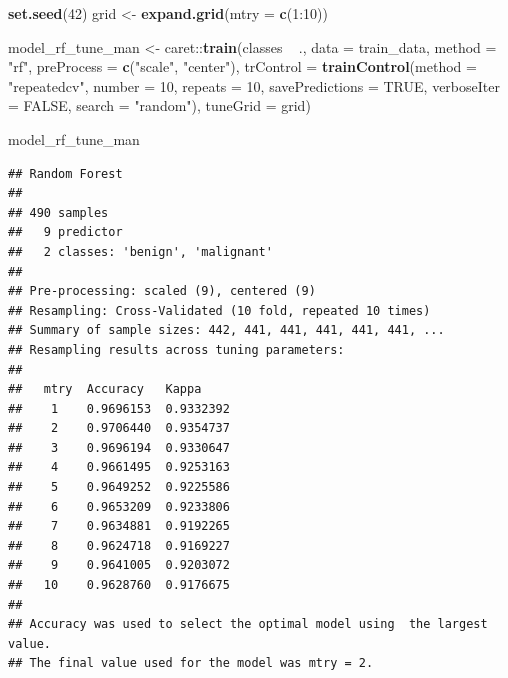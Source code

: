 \documentclass[]{article}
\newenvironment{Shaded}{\begin{snugshade}}{\end{snugshade}}
\newcommand{\KeywordTok}[1]{\textcolor[rgb]{0.13,0.29,0.53}{\textbf{{#1}}}}
\newcommand{\DataTypeTok}[1]{\textcolor[rgb]{0.13,0.29,0.53}{{#1}}}
\newcommand{\DecValTok}[1]{\textcolor[rgb]{0.00,0.00,0.81}{{#1}}}
\newcommand{\StringTok}[1]{\textcolor[rgb]{0.31,0.60,0.02}{{#1}}}
\newcommand{\OtherTok}[1]{\textcolor[rgb]{0.56,0.35,0.01}{{#1}}}
\newcommand{\NormalTok}[1]{{#1}}
\begin{document}
\begin{Shaded}
\begin{Highlighting}[]
\KeywordTok{set.seed}\NormalTok{(}\DecValTok{42}\NormalTok{)}
\NormalTok{grid <-}\StringTok{ }\KeywordTok{expand.grid}\NormalTok{(}\DataTypeTok{mtry =} \KeywordTok{c}\NormalTok{(}\DecValTok{1}\NormalTok{:}\DecValTok{10}\NormalTok{))}

\NormalTok{model_rf_tune_man <-}\StringTok{ }\NormalTok{caret::}\KeywordTok{train}\NormalTok{(classes ~}\StringTok{ }\NormalTok{.,}
                         \DataTypeTok{data =} \NormalTok{train_data,}
                         \DataTypeTok{method =} \StringTok{"rf"}\NormalTok{,}
                         \DataTypeTok{preProcess =} \KeywordTok{c}\NormalTok{(}\StringTok{"scale"}\NormalTok{, }\StringTok{"center"}\NormalTok{),}
                         \DataTypeTok{trControl =} \KeywordTok{trainControl}\NormalTok{(}\DataTypeTok{method =} \StringTok{"repeatedcv"}\NormalTok{, }
                                                  \DataTypeTok{number =} \DecValTok{10}\NormalTok{, }
                                                  \DataTypeTok{repeats =} \DecValTok{10}\NormalTok{, }
                                                  \DataTypeTok{savePredictions =} \OtherTok{TRUE}\NormalTok{, }
                                                  \DataTypeTok{verboseIter =} \OtherTok{FALSE}\NormalTok{,}
                                                  \DataTypeTok{search =} \StringTok{"random"}\NormalTok{),}
                         \DataTypeTok{tuneGrid =} \NormalTok{grid)}
\end{Highlighting}
\end{Shaded}

\begin{Shaded}
\begin{Highlighting}[]
\NormalTok{model_rf_tune_man}
\end{Highlighting}
\end{Shaded}

\begin{verbatim}
## Random Forest 
## 
## 490 samples
##   9 predictor
##   2 classes: 'benign', 'malignant' 
## 
## Pre-processing: scaled (9), centered (9) 
## Resampling: Cross-Validated (10 fold, repeated 10 times) 
## Summary of sample sizes: 442, 441, 441, 441, 441, 441, ... 
## Resampling results across tuning parameters:
## 
##   mtry  Accuracy   Kappa    
##    1    0.9696153  0.9332392
##    2    0.9706440  0.9354737
##    3    0.9696194  0.9330647
##    4    0.9661495  0.9253163
##    5    0.9649252  0.9225586
##    6    0.9653209  0.9233806
##    7    0.9634881  0.9192265
##    8    0.9624718  0.9169227
##    9    0.9641005  0.9203072
##   10    0.9628760  0.9176675
## 
## Accuracy was used to select the optimal model using  the largest value.
## The final value used for the model was mtry = 2.
\end{verbatim}
\end{document}
